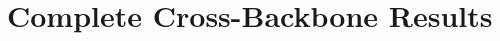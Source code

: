 \documentclass[11pt]{article}
\begin{document}
\twocolumn[\begin{minipage}{\textwidth}
\captionsetup{type=table}

\end{minipage}\vspace{1em}]

\null\clearpage
\onecolumn
\appendix
\setcounter{section}{3}
\section{Complete Cross-Backbone Results}
\label{app:full_results}
\renewenvironment{table*}[1][]{\par\noindent\begin{minipage}{\textwidth}\captionsetup{type=table}}{\end{minipage}\par}

\vspace{1em}

\vspace{1em}

\end{document}
